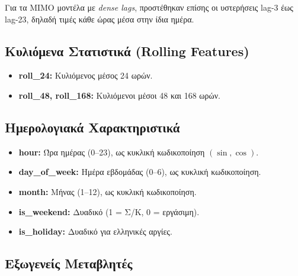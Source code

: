 Για τα MIMO μοντέλα με \textit{dense lags}, προστέθηκαν επίσης οι υστερήσεις lag-3 έως lag-23,
δηλαδή τιμές κάθε ώρας μέσα στην ίδια ημέρα.

\subsection{Κυλιόμενα Στατιστικά (Rolling Features)}

\begin{itemize}
    \item \textbf{roll\_24:} Κυλιόμενος μέσος 24 ωρών.
    \item \textbf{roll\_48, roll\_168:} Κυλιόμενοι μέσοι 48 και 168 ωρών.
\end{itemize}

\subsection{Ημερολογιακά Χαρακτηριστικά}

\begin{itemize}
    \item \textbf{hour:} Ώρα ημέρας (0--23), ως κυκλική κωδικοποίηση $(\sin, \cos)$.
    \item \textbf{day\_of\_week:} Ημέρα εβδομάδας (0--6), ως κυκλική κωδικοποίηση.
    \item \textbf{month:} Μήνας (1--12), ως κυκλική κωδικοποίηση.
    \item \textbf{is\_weekend:} Δυαδικό (1 = Σ/Κ, 0 = εργάσιμη).
    \item \textbf{is\_holiday:} Δυαδικό για ελληνικές αργίες.
\end{itemize}

\subsection{Εξωγενείς Μεταβλητές}

